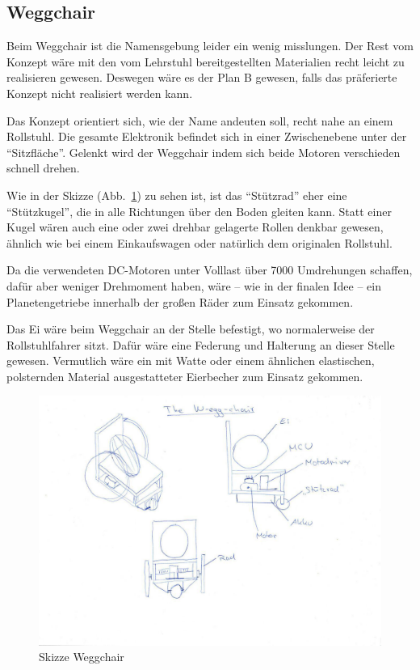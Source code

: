 \subsection{Weggchair}
Beim Weggchair ist die Namensgebung leider ein wenig misslungen. 
Der Rest vom Konzept wäre mit den vom Lehrstuhl bereitgestellten Materialien recht leicht zu realisieren gewesen.
Deswegen wäre es der Plan B gewesen, falls das präferierte Konzept nicht realisiert werden kann. 

Das Konzept orientiert sich, wie der Name andeuten soll, recht nahe an einem Rollstuhl. 
Die gesamte Elektronik befindet sich in einer Zwischenebene unter der ``Sitzfläche''. 
Gelenkt wird der Weggchair indem sich beide Motoren verschieden schnell drehen. 

Wie in der Skizze (Abb.~\ref{bild:weggchair}) zu sehen ist, ist das ``Stützrad'' eher eine ``Stützkugel'', die in alle Richtungen über den Boden gleiten kann. 
Statt einer Kugel wären auch eine oder zwei drehbar gelagerte Rollen denkbar gewesen, ähnlich wie bei einem Einkaufswagen oder natürlich dem originalen Rollstuhl. 

Da die verwendeten DC-Motoren unter Volllast über 7000 Umdrehungen schaffen, dafür aber weniger Drehmoment haben, wäre -- wie in der finalen Idee -- ein Planetengetriebe innerhalb der großen Räder zum Einsatz gekommen. 

Das Ei wäre beim Weggchair an der Stelle befestigt, wo normalerweise der Rollstuhlfahrer sitzt. Dafür wäre eine Federung und Halterung an dieser Stelle gewesen. Vermutlich wäre ein mit Watte oder einem ähnlichen elastischen, polsternden Material ausgestatteter Eierbecher zum Einsatz gekommen.

\begin{figure}[!htbp]
	\centering
	\includegraphics[width=.9\textwidth]{bilder/weggchair.jpg}
	\caption{Skizze Weggchair}
	\label{bild:weggchair}
\end{figure}


